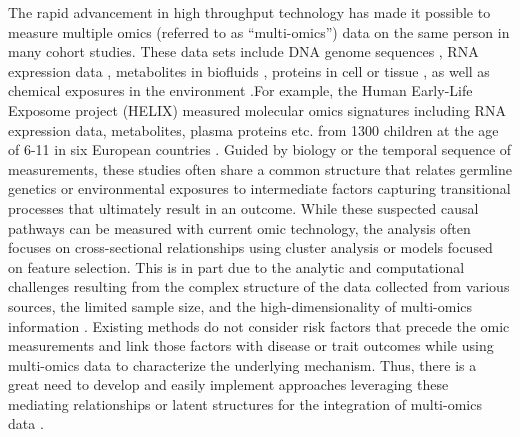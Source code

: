 The rapid advancement in high throughput technology has made it possible to measure multiple omics (referred to as ``multi-omics'') data on the same person in many cohort studies. These data sets include DNA genome sequences \citep{goodwin2016coming}, RNA expression data \citep{ozsolak2011rna}, metabolites in biofluids \citep{beger2013review}, proteins in cell or tissue \citep{aslam2017proteomics}, as well as chemical exposures in the environment \citep{wild2005complementing}.For example, the Human Early-Life Exposome project (HELIX) measured molecular omics signatures including RNA expression data, metabolites, plasma proteins etc. from 1300 children at the age of 6-11 in six European countries \citep{vrijheid2014human}. Guided by biology or the temporal sequence of measurements, these studies often share a common structure that relates germline genetics or environmental exposures to intermediate factors capturing transitional processes that ultimately result in an outcome. While these suspected causal pathways can be measured with current omic technology, the analysis often focuses on cross-sectional relationships using cluster analysis or models focused on feature selection. This is in part due to the analytic and computational challenges resulting from the complex structure of the data collected from various sources, the limited sample size, and the high-dimensionality of multi-omics information \citep{tini2019multi}. Existing methods do not consider risk factors that precede the omic measurements and link those factors with disease or trait outcomes while using multi-omics data to characterize the underlying mechanism. Thus, there is a great need to develop and easily implement approaches leveraging these mediating relationships or latent structures for the integration of multi-omics data \citep{subramanian2020multi}. 

